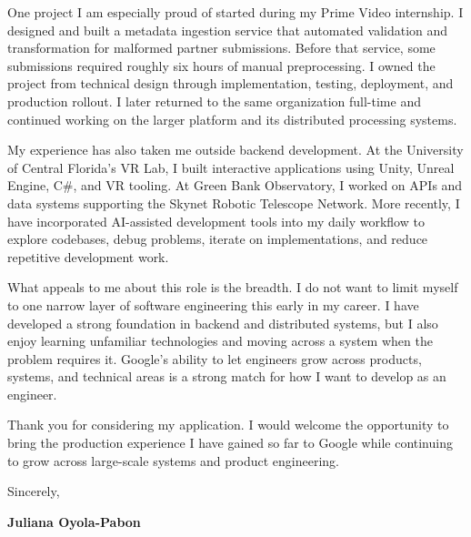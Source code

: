 \documentclass[10pt,letterpaper]{article}
\begin{document}
One project I am especially proud of started during my Prime Video internship.
I designed and built a metadata ingestion service that automated validation
and transformation for malformed partner submissions. Before that service,
some submissions required roughly six hours of manual preprocessing. I owned
the project from technical design through implementation, testing, deployment,
and production rollout. I later returned to the same organization full-time
and continued working on the larger platform and its distributed processing
systems.

My experience has also taken me outside backend development. At the University
of Central Florida's VR Lab, I built interactive applications using Unity,
Unreal Engine, C\#, and VR tooling. At Green Bank Observatory, I worked on
APIs and data systems supporting the Skynet Robotic Telescope Network. More
recently, I have incorporated AI-assisted development tools into my daily
workflow to explore codebases, debug problems, iterate on implementations,
and reduce repetitive development work.

What appeals to me about this role is the breadth. I do not want to limit
myself to one narrow layer of software engineering this early in my career.
I have developed a strong foundation in backend and distributed systems, but
I also enjoy learning unfamiliar technologies and moving across a system when
the problem requires it. Google's ability to let engineers grow across
products, systems, and technical areas is a strong match for how I want to
develop as an engineer.

Thank you for considering my application. I would welcome the opportunity to
bring the production experience I have gained so far to Google while continuing
to grow across large-scale systems and product engineering.

\vspace{16pt}

Sincerely,

\vspace{4pt}

\textbf{Juliana Oyola-Pabon}
\end{document}
